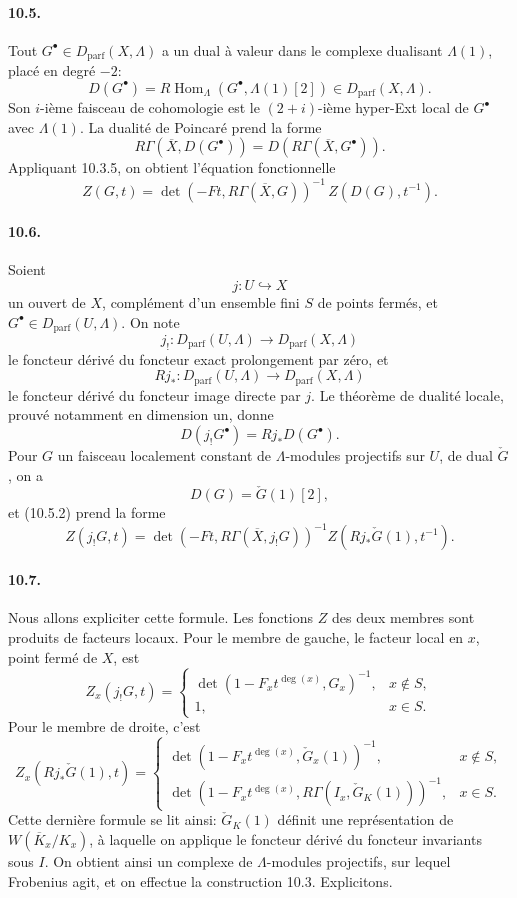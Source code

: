 \documentclass[10pt]{article}
\newcommand{\Hom}{\operatorname{Hom}}
\providecommand{\Hom}{\operatorname{Hom}}
\providecommand{\Hom}{\operatorname{Hom}}
\providecommand{\Dparf}{D_{\mathrm{parf}}}
\providecommand{\Hom}{\operatorname{Hom}}
\begin{document}
\paragraph{10.5.} Tout \(G^\bullet\in\Dparf(X,\Lambda)\) a un dual à valeur dans le complexe dualisant \(\Lambda(1)\), placé en degré \(-2\):
\[
D(G^\bullet)=R\Hom_\Lambda(G^\bullet,\Lambda(1)[2])\in\Dparf(X,\Lambda).
\]
Son \(i\)-ième faisceau de cohomologie est le \((2+i)\)-ième hyper-Ext local de \(G^\bullet\) avec \(\Lambda(1)\). La dualité de Poincaré prend la forme
\[
\tag{10.5.1}
R\Gamma(\overline X,D(G^\bullet))=D(R\Gamma(\overline X,G^\bullet)).
\]
Appliquant 10.3.5, on obtient l'équation fonctionnelle
\[
\tag{10.5.2}
Z(G,t)=
\det(-Ft,R\Gamma(\overline X,G))^{-1}\,
Z(D(G),t^{-1}).
\]

\paragraph{10.6.} Soient
\[
j:U\hookrightarrow X
\]
un ouvert de \(X\), complément d'un ensemble fini \(S\) de points fermés, et \(G^\bullet\in\Dparf(U,\Lambda)\). On note
\[
j_!:\Dparf(U,\Lambda)\longrightarrow\Dparf(X,\Lambda)
\]
le foncteur dérivé du foncteur exact prolongement par zéro, et
\[
Rj_*:\Dparf(U,\Lambda)\longrightarrow\Dparf(X,\Lambda)
\]
le foncteur dérivé du foncteur image directe par \(j\). Le théorème de dualité locale, prouvé notamment en dimension un, donne
\[
\tag{10.6.1}
D(j_!G^\bullet)=Rj_*D(G^\bullet).
\]
Pour \(G\) un faisceau localement constant de \(\Lambda\)-modules projectifs sur \(U\), de dual \(\check G\), on a
\[
D(G)=\check G(1)[2],
\]
et (10.5.2) prend la forme
\[
\tag{10.6.2}
Z(j_!G,t)=
\det(-Ft,R\Gamma(\overline X,j_!G))^{-1}
Z(Rj_*\check G(1),t^{-1}).
\]

\paragraph{10.7.} Nous allons expliciter cette formule. Les fonctions \(Z\) des deux membres sont produits de facteurs locaux. Pour le membre de gauche, le facteur local en \(x\), point fermé de \(X\), est
\[
Z_x(j_!G,t)=
\begin{cases}
\det(1-F_x t^{\deg(x)},G_x)^{-1},&x\notin S,\\
1,&x\in S.
\end{cases}
\]
Pour le membre de droite, c'est
\[
Z_x(Rj_*\check G(1),t)=
\begin{cases}
\det(1-F_x t^{\deg(x)},\check G_x(1))^{-1},&x\notin S,\\
\det(1-F_x t^{\deg(x)},R\Gamma(I_x,\check G_K(1)))^{-1},&x\in S.
\end{cases}
\]
Cette dernière formule se lit ainsi: \(\check G_K(1)\) définit une représentation de \(W(\overline K_x/K_x)\), à laquelle on applique le foncteur dérivé du foncteur invariants sous \(I\). On obtient ainsi un complexe de \(\Lambda\)-modules projectifs, sur lequel Frobenius agit, et on effectue la construction 10.3. Explicitons.
\end{document}
